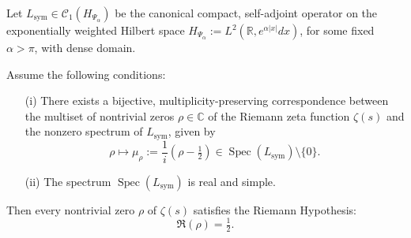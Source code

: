 \begin{lemma}
\label{lem:inject-zero-real-spectrum}
Let \( L_{\mathrm{sym}} \in \mathcal{C}_1(H_{\Psi_\alpha}) \) be the canonical compact, self-adjoint operator on the exponentially weighted Hilbert space \( H_{\Psi_\alpha} := L^2(\mathbb{R}, e^{\alpha |x|} dx) \), for some fixed \( \alpha > \pi \), with dense domain.

Assume the following conditions:
\begin{enumerate}
  \item[\textnormal{(i)}] There exists a bijective, multiplicity-preserving correspondence between the multiset of nontrivial zeros \( \rho \in \mathbb{C} \) of the Riemann zeta function \( \zeta(s) \) and the nonzero spectrum of \( L_{\mathrm{sym}} \), given by
  \[
  \rho \mapsto \mu_\rho := \frac{1}{i}(\rho - \tfrac{1}{2}) \in \operatorname{Spec}(L_{\mathrm{sym}}) \setminus \{0\}.
  \]
  
  \item[\textnormal{(ii)}] The spectrum \( \operatorname{Spec}(L_{\mathrm{sym}}) \) is real and simple.
\end{enumerate}

Then every nontrivial zero \( \rho \) of \( \zeta(s) \) satisfies the Riemann Hypothesis:
\[
\Re(\rho) = \tfrac{1}{2}.
\]
\end{lemma}
